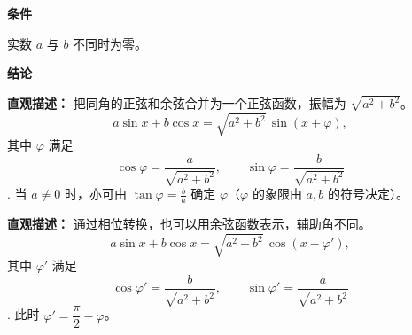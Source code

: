 \begin{statementbox}

	\textbf{\textcolor{CStatement}{条件}}
	\begin{description}[style=nextline, leftmargin=2.8em, labelsep=0.5em, itemsep=0.35em]
		\item[\textbf{\textcolor{CStatement}{条件 1（系数不全零）：}}] 实数 $a$ 与 $b$ 不同时为零。
	\end{description}

	\textbf{\textcolor{CStatement}{结论}}
	\begin{description}[style=nextline, leftmargin=2.8em, labelsep=0.5em, itemsep=0.45em]
		\item[\textbf{\textcolor{CStatement}{结论一（正弦合一公式）：}}]
			\textbf{\textcolor{CStatement}{直观描述：}}
			把同角的正弦和余弦合并为一个正弦函数，振幅为 $\sqrt{a^{2}+b^{2}}$。
			\[
				a\sin x + b\cos x = \sqrt{a^{2}+b^{2}}\,\sin(x+\varphi),
			\]
			其中 $\varphi$ 满足
			\[
				\cos\varphi = \frac{a}{\sqrt{a^{2}+b^{2}}},
				\qquad
				\sin\varphi = \frac{b}{\sqrt{a^{2}+b^{2}}}
			\].
			当 $a\neq 0$ 时，亦可由 $\displaystyle\tan\varphi = \frac{b}{a}$ 确定 $\varphi$（$\varphi$ 的象限由 $a,b$ 的符号决定）。

		\item[\textbf{\textcolor{CStatement}{推广结论（余弦等价形式）：}}]
			\textbf{\textcolor{CStatement}{直观描述：}}
			通过相位转换，也可以用余弦函数表示，辅助角不同。
			\[
				a\sin x + b\cos x = \sqrt{a^{2}+b^{2}}\,\cos(x-\varphi'),
			\]
			其中 $\varphi'$ 满足
			\[
				\cos\varphi' = \frac{b}{\sqrt{a^{2}+b^{2}}},
				\qquad
				\sin\varphi' = \frac{a}{\sqrt{a^{2}+b^{2}}}
			\].
			此时 $\varphi' = \dfrac{\pi}{2} - \varphi$。
	\end{description}

\end{statementbox}
